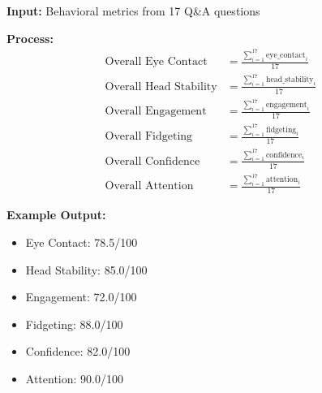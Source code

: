 \documentclass[12pt,a4paper]{article}
\begin{document}
\begin{tcolorbox}[colback=primaryblue!5,colframe=primaryblue,title=\textbf{STEP 1: Aggregate Behavioral Metrics}]
\textbf{Input:} Behavioral metrics from 17 Q\&A questions

\textbf{Process:}
\begin{align*}
\text{Overall Eye Contact} &= \frac{\sum_{i=1}^{17} \text{eye\_contact}_i}{17} \\
\text{Overall Head Stability} &= \frac{\sum_{i=1}^{17} \text{head\_stability}_i}{17} \\
\text{Overall Engagement} &= \frac{\sum_{i=1}^{17} \text{engagement}_i}{17} \\
\text{Overall Fidgeting} &= \frac{\sum_{i=1}^{17} \text{fidgeting}_i}{17} \\
\text{Overall Confidence} &= \frac{\sum_{i=1}^{17} \text{confidence}_i}{17} \\
\text{Overall Attention} &= \frac{\sum_{i=1}^{17} \text{attention}_i}{17}
\end{align*}

\textbf{Example Output:}
\begin{itemize}
    \item Eye Contact: 78.5/100
    \item Head Stability: 85.0/100
    \item Engagement: 72.0/100
    \item Fidgeting: 88.0/100
    \item Confidence: 82.0/100
    \item Attention: 90.0/100
\end{itemize}
\end{tcolorbox}

\vspace{0.5cm}
\end{document}
